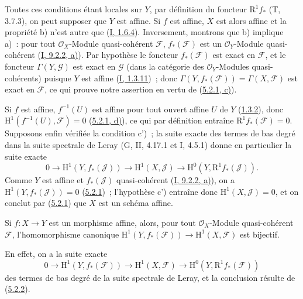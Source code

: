 Toutes ces conditions étant locales sur $Y$, par définition du foncteur
$\mathrm{R}^1f_*$ (T, 3.7.3), on peut supposer que $Y$ est affine. Si $f$
est affine, $X$ est alors affine et la propriété b) n'est autre que
(\hyperref[I.1.6.4-fr]{I, 1.6.4}). Inversement, montrons que b) implique
a)~: pour tout $\mathcal{O}_X$-Module quasi-cohérent $\mathcal{F}$,
$f_*(\mathcal{F})$ est un $\mathcal{O}_Y$-Module quasi-cohérent
(\hyperref[I.9.2.2-fr]{I, 9.2.2, a)}). Par hypothèse le foncteur
$f_*(\mathcal{F})$ est exact en $\mathcal{F}$, et le foncteur
$\Gamma(Y,\mathcal{G})$ est exact en $\mathcal{G}$ (dans la catégorie des
$\mathcal{O}_Y$-Modules quasi-cohérents) puisque $Y$ est affine
(\hyperref[I.1.3.11-fr]{I, 1.3.11})~; donc
$\Gamma(Y,f_*(\mathcal{F}))=\Gamma(X,\mathcal{F})$ est exact en
$\mathcal{F}$, ce qui prouve notre assertion en vertu de
(\hyperref[II.5.2.1-fr]{5.2.1, c)}).

Si $f$ est affine, $f^{-1}(U)$ est affine pour tout ouvert affine $U$ de
$Y$ (\hyperref[II.1.3.2-fr]{1.3.2}), donc
$\mathrm{H}^1(f^{-1}(U),\mathcal{F})=0$
(\hyperref[II.5.2.1-fr]{5.2.1, d)}), ce qui par définition entraîne
$\mathrm{R}^1f_*(\mathcal{F})=0$. Supposons enfin vérifiée la condition
c')~; la suite exacte des termes de bas degré dans la suite spectrale de
Leray (G, II, 4.17.1 et I, 4.5.1) donne en particulier la suite exacte
\[
  0\to\mathrm{H}^1(Y,f_*(\mathcal{J}))\to
  \mathrm{H}^1(X,\mathcal{J})\to
  \mathrm{H}^0(Y,\mathrm{R}^1f_*(\mathcal{J})).
\]
Comme $Y$ est affine et $f_*(\mathcal{J})$ quasi-cohérent
(\hyperref[I.9.2.2-fr]{I, 9.2.2, a)}), on a
$\mathrm{H}^1(Y,f_*(\mathcal{J}))=0$
(\hyperref[II.5.2.1-fr]{5.2.1})~; l'hypothèse c') entraîne donc
$\mathrm{H}^1(X,\mathcal{J})=0$, et on conclut par
(\hyperref[II.5.2.1-fr]{5.2.1}) que $X$ est un schéma affine.

\begin{corollary}[5.2.3]
\label{II.5.2.3-fr}
Si $f:X\to Y$ est un morphisme affine, alors, pour tout
$\mathcal{O}_X$-Module quasi-cohérent $\mathcal{F}$, l'homomorphisme
canonique
$\mathrm{H}^1(Y,f_*(\mathcal{F}))\to\mathrm{H}^1(X,\mathcal{F})$ est
bijectif.
\end{corollary}


En effet, on a la suite exacte
\[
  0\to\mathrm{H}^1(Y,f_*(\mathcal{F}))\to
  \mathrm{H}^1(X,\mathcal{F})\to
  \mathrm{H}^0(Y,\mathrm{R}^1f_*(\mathcal{F}))
\]
des termes de bas degré de la suite spectrale de Leray, et la conclusion
résulte de (\hyperref[II.5.2.2-fr]{5.2.2}).

